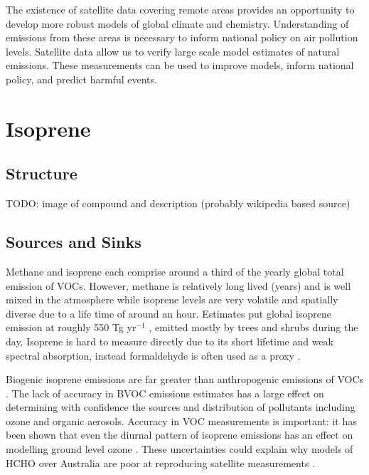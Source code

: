     The existence of satellite data covering remote areas provides an opportunity to develop more robust models of global climate and chemistry.
    Understanding of emissions from these areas is necessary to inform national policy on air pollution levels.
    Satellite data allow us to verify large scale model estimates of natural emissions.
    These measurements can be used to improve models, inform national policy, and predict harmful events.

\section{Isoprene}
\label{ch1:sec:isoprene}

  \subsection{Structure}
    TODO: image of compound and description (probably wikipedia based source)

  \subsection{Sources and Sinks}
    Methane and isoprene each comprise around a third of the yearly global total emission of VOCs.
    However, methane is relatively long lived (years) and is well mixed in the atmosphere while isoprene levels are very volatile and spatially diverse due to a life time of around an hour. Estimates put global isoprene emission at roughly 550 Tg yr$^{-1}$ \citep{Guenther2006,Monks2015}, emitted mostly by trees and shrubs during the day.
    Isoprene is hard to measure directly due to its short lifetime and weak spectral absorption, instead formaldehyde is often used as a proxy \citep{Marais_2012,bauwens2013satellite,Kefauver2014}.

    Biogenic isoprene emissions are far greater than anthropogenic emissions of VOCs \citep{Guenther2006, Kefauver2014}. 
    The lack of accuracy in BVOC emissions estimates has a large effect on determining with confidence the sources and distribution of pollutants including ozone and organic aerosols.
    Accuracy in VOC measurements is important: it has been shown that even the diurnal pattern of isoprene emissions has an effect on modelling ground level ozone \citep{Hewitt_2011,Fan_2004}.
    These uncertainties could explain why models of HCHO over Australia are poor at reproducing satellite measurements \citep{Stavrakou2009}.


